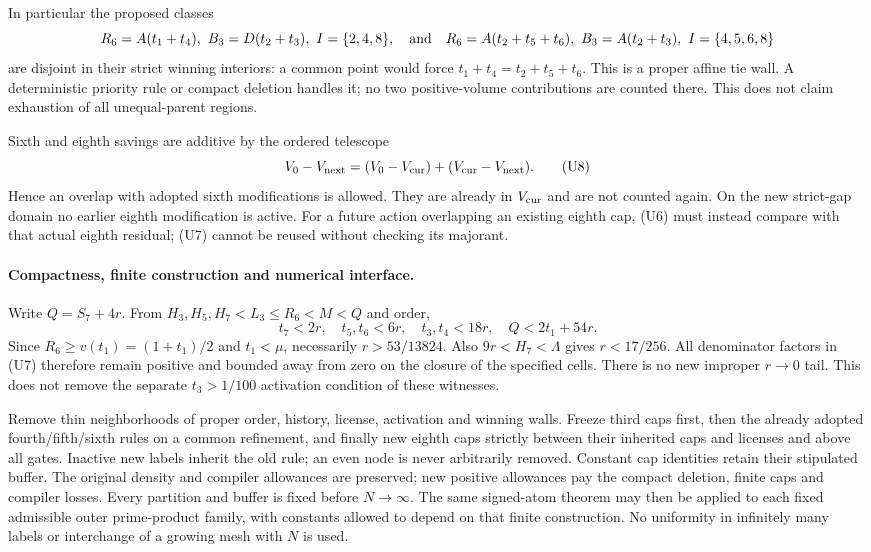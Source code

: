 In particular the proposed classes
\[
 R_6=A(t_1+t_4),\ B_3=D(t_2+t_3),\ I=\{2,4,8\},
 \quad\hbox{and}\quad
 R_6=A(t_2+t_5+t_6),\ B_3=A(t_2+t_3),\ I=\{4,5,6,8\}
\]
are disjoint in their strict winning interiors: a common point
would force $t_1+t_4=t_2+t_5+t_6$. This is a proper affine tie
wall. A deterministic priority rule or compact deletion handles
it; no two positive-volume contributions are counted there.
This does not claim exhaustion of all unequal-parent regions.

Sixth and eighth savings are additive by the ordered telescope
\[
 V_0-V_{\rm next}
 =(V_0-V_{\rm cur})+(V_{\rm cur}-V_{\rm next}).        \tag{U8}
\]
Hence an overlap with adopted sixth modifications is allowed.
They are already in $V_{\rm cur}$ and are not counted again. On the
new strict-gap domain no earlier eighth modification is active.
For a future action overlapping an existing eighth cap, (U6) must
instead compare with that actual eighth residual; (U7) cannot be
reused without checking its majorant.

\paragraph{Compactness, finite construction and numerical interface.}
Write $Q=S_7+4r$. From $H_3,H_5,H_7<L_3\le R_6<M<Q$ and order,
\[
 t_7<2r,\quad t_5,t_6<6r,\quad t_3,t_4<18r,
 \quad Q<2t_1+54r.
\]
Since $R_6\ge v(t_1)=(1+t_1)/2$ and $t_1<\mu$, necessarily
$r>53/13824$. Also $9r<H_7<\Lambda$ gives $r<17/256$.
All denominator factors in (U7) therefore remain positive and
bounded away from zero on the closure of the specified cells.
There is no new improper $r\to0$ tail. This does not remove the
separate $t_3>1/100$ activation condition of these witnesses.

Remove thin neighborhoods of proper order, history, license,
activation and winning walls. Freeze third caps first, then the
already adopted fourth/fifth/sixth rules on a common refinement,
and finally new eighth caps strictly between their inherited caps
and licenses and above all gates. Inactive new labels inherit the
old rule; an even node is never arbitrarily removed. Constant cap
identities retain their stipulated buffer. The original density
and compiler allowances are preserved; new positive allowances
pay the compact deletion, finite caps and compiler losses. Every
partition and buffer is fixed before $N\to\infty$. The same
signed-atom theorem may then be applied to each fixed admissible
outer prime-product family, with constants allowed to depend on
that finite construction. No uniformity in infinitely many labels
or interchange of a growing mesh with $N$ is used.

